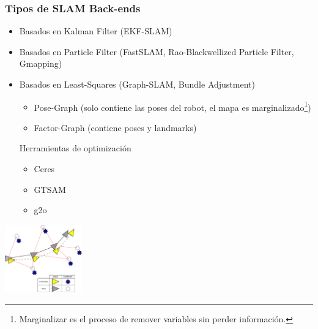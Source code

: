 \begin{frame}
    \frametitle{Tipos de SLAM Back-ends}
    \footnotesize
    \begin{itemize}
        \item Basados en Kalman Filter (EKF-SLAM)
        \item Basados en Particle Filter (FastSLAM, Rao-Blackwellized Particle Filter, Gmapping)
        \item Basados en Least-Squares (Graph-SLAM, Bundle Adjustment)
        \begin{itemize}
            \item Pose-Graph (solo contiene las poses del robot, el mapa es marginalizado\footnote{Marginalizar es el proceso de remover variables sin perder información.})
            \item Factor-Graph (contiene poses y landmarks)
        \end{itemize}
            Herramientas de optimización
            \begin{itemize}
            \item Ceres
            \item GTSAM
            \item g2o
            \end{itemize}
    \end{itemize}

    \begin{center}
        \includegraphics[width=0.25\textwidth]{images/slam-landmarks.pdf}
    \end{center}
    
\end{frame}

